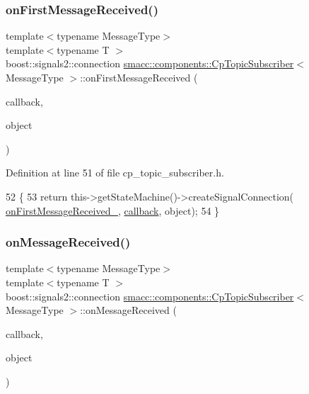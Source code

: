 \subsubsection{\texorpdfstring{on\+First\+Message\+Received()}{onFirstMessageReceived()}}
{\footnotesize\ttfamily template$<$typename Message\+Type$>$ \\
template$<$typename T $>$ \\
boost\+::signals2\+::connection \hyperlink{classsmacc_1_1components_1_1CpTopicSubscriber}{smacc\+::components\+::\+Cp\+Topic\+Subscriber}$<$ Message\+Type $>$\+::on\+First\+Message\+Received (\begin{DoxyParamCaption}\item[{void(T\+::$\ast$)(const Message\+Type \&)}]{callback,  }\item[{T $\ast$}]{object }\end{DoxyParamCaption})\hspace{0.3cm}{\ttfamily [inline]}}



Definition at line 51 of file cp\+\_\+topic\+\_\+subscriber.\+h.


\begin{DoxyCode}
52     \{
53         \textcolor{keywordflow}{return} this->getStateMachine()->createSignalConnection(
      \hyperlink{classsmacc_1_1components_1_1CpTopicSubscriber_ab8e319857951489298faefa4882e49cc}{onFirstMessageReceived\_}, \hyperlink{sm__ridgeback__barrel__search__1_2servers_2opencv__perception__node_2opencv__perception__node_8cpp_a050e697bd654facce10ea3f6549669b3}{callback}, \textcolor{keywordtype}{object});
54     \}
\end{DoxyCode}
\mbox{\label{classsmacc_1_1components_1_1CpTopicSubscriber_af8f626a4ef4aa6ff699359f136372292}} 
\subsubsection{\texorpdfstring{on\+Message\+Received()}{onMessageReceived()}}
{\footnotesize\ttfamily template$<$typename Message\+Type$>$ \\
template$<$typename T $>$ \\
boost\+::signals2\+::connection \hyperlink{classsmacc_1_1components_1_1CpTopicSubscriber}{smacc\+::components\+::\+Cp\+Topic\+Subscriber}$<$ Message\+Type $>$\+::on\+Message\+Received (\begin{DoxyParamCaption}\item[{void(T\+::$\ast$)(const Message\+Type \&)}]{callback,  }\item[{T $\ast$}]{object }\end{DoxyParamCaption})\hspace{0.3cm}{\ttfamily [inline]}}



